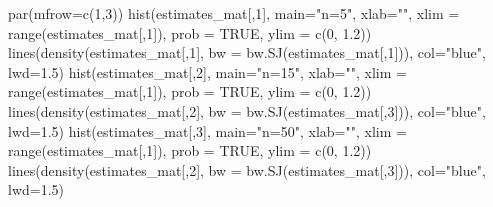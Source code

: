 \documentclass[
  letterpaper,
  DIV=11,
  numbers=noendperiod]{scrreprt}
\newenvironment{Shaded}{\begin{snugshade}}{\end{snugshade}}
\newcommand{\AttributeTok}[1]{\textcolor[rgb]{0.40,0.45,0.13}{#1}}
\newcommand{\ConstantTok}[1]{\textcolor[rgb]{0.56,0.35,0.01}{#1}}
\newcommand{\DecValTok}[1]{\textcolor[rgb]{0.68,0.00,0.00}{#1}}
\newcommand{\FloatTok}[1]{\textcolor[rgb]{0.68,0.00,0.00}{#1}}
\newcommand{\FunctionTok}[1]{\textcolor[rgb]{0.28,0.35,0.67}{#1}}
\newcommand{\NormalTok}[1]{\textcolor[rgb]{0.00,0.23,0.31}{#1}}
\newcommand{\StringTok}[1]{\textcolor[rgb]{0.13,0.47,0.30}{#1}}
\theoremstyle{definition}
\theoremstyle{plain}
\theoremstyle{plain}
\theoremstyle{remark}
\begin{document}
\begin{Shaded}
\begin{Highlighting}[]
\FunctionTok{par}\NormalTok{(}\AttributeTok{mfrow=}\FunctionTok{c}\NormalTok{(}\DecValTok{1}\NormalTok{,}\DecValTok{3}\NormalTok{))}
\FunctionTok{hist}\NormalTok{(estimates\_mat[,}\DecValTok{1}\NormalTok{], }\AttributeTok{main=}\StringTok{"n=5"}\NormalTok{, }\AttributeTok{xlab=}\StringTok{""}\NormalTok{,  }\AttributeTok{xlim =} \FunctionTok{range}\NormalTok{(estimates\_mat[,}\DecValTok{1}\NormalTok{]), }\AttributeTok{prob =} \ConstantTok{TRUE}\NormalTok{, }\AttributeTok{ylim =} \FunctionTok{c}\NormalTok{(}\DecValTok{0}\NormalTok{, }\FloatTok{1.2}\NormalTok{))}
\FunctionTok{lines}\NormalTok{(}\FunctionTok{density}\NormalTok{(estimates\_mat[,}\DecValTok{1}\NormalTok{], }\AttributeTok{bw =} \FunctionTok{bw.SJ}\NormalTok{(estimates\_mat[,}\DecValTok{1}\NormalTok{])), }\AttributeTok{col=}\StringTok{"blue"}\NormalTok{, }\AttributeTok{lwd=}\FloatTok{1.5}\NormalTok{)}
\FunctionTok{hist}\NormalTok{(estimates\_mat[,}\DecValTok{2}\NormalTok{], }\AttributeTok{main=}\StringTok{"n=15"}\NormalTok{, }\AttributeTok{xlab=}\StringTok{""}\NormalTok{, }\AttributeTok{xlim =} \FunctionTok{range}\NormalTok{(estimates\_mat[,}\DecValTok{1}\NormalTok{]), }\AttributeTok{prob =} \ConstantTok{TRUE}\NormalTok{, }\AttributeTok{ylim =} \FunctionTok{c}\NormalTok{(}\DecValTok{0}\NormalTok{, }\FloatTok{1.2}\NormalTok{))}
\FunctionTok{lines}\NormalTok{(}\FunctionTok{density}\NormalTok{(estimates\_mat[,}\DecValTok{2}\NormalTok{], }\AttributeTok{bw =} \FunctionTok{bw.SJ}\NormalTok{(estimates\_mat[,}\DecValTok{3}\NormalTok{])), }\AttributeTok{col=}\StringTok{"blue"}\NormalTok{, }\AttributeTok{lwd=}\FloatTok{1.5}\NormalTok{)}
\FunctionTok{hist}\NormalTok{(estimates\_mat[,}\DecValTok{3}\NormalTok{], }\AttributeTok{main=}\StringTok{"n=50"}\NormalTok{, }\AttributeTok{xlab=}\StringTok{""}\NormalTok{, }\AttributeTok{xlim =} \FunctionTok{range}\NormalTok{(estimates\_mat[,}\DecValTok{1}\NormalTok{]), }\AttributeTok{prob =} \ConstantTok{TRUE}\NormalTok{, }\AttributeTok{ylim =} \FunctionTok{c}\NormalTok{(}\DecValTok{0}\NormalTok{, }\FloatTok{1.2}\NormalTok{))}
\FunctionTok{lines}\NormalTok{(}\FunctionTok{density}\NormalTok{(estimates\_mat[,}\DecValTok{2}\NormalTok{], }\AttributeTok{bw =} \FunctionTok{bw.SJ}\NormalTok{(estimates\_mat[,}\DecValTok{3}\NormalTok{])), }\AttributeTok{col=}\StringTok{"blue"}\NormalTok{, }\AttributeTok{lwd=}\FloatTok{1.5}\NormalTok{)}
\end{Highlighting}
\end{Shaded}
\end{document}
